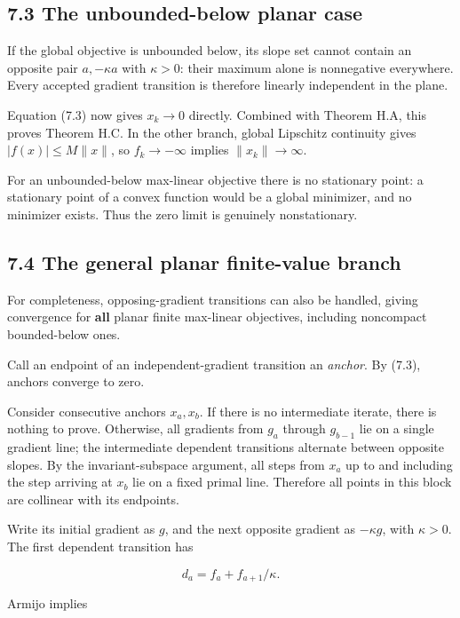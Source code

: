 \subsection{7.3 The unbounded-below planar
case}\label{H:the-unbounded-below-planar-case}

If the global objective is unbounded below, its slope set cannot contain
an opposite pair \(a,-\kappa a\) with \(\kappa>0\): their maximum alone
is nonnegative everywhere. Every accepted gradient transition is
therefore linearly independent in the plane.

Equation (7.3) now gives \(x_k\to0\) directly. Combined with Theorem H.A,
this proves Theorem H.C. In the other branch, global Lipschitz continuity
gives \(|f(x)|\le M\|x\|\), so \(f_k\to-\infty\) implies
\(\|x_k\|\to\infty\).

For an unbounded-below max-linear objective there is no stationary
point: a stationary point of a convex function would be a global
minimizer, and no minimizer exists. Thus the zero limit is genuinely
nonstationary.

\subsection{7.4 The general planar finite-value
branch}\label{H:the-general-planar-finite-value-branch}

For completeness, opposing-gradient transitions can also be handled,
giving convergence for \textbf{all} planar finite max-linear objectives,
including noncompact bounded-below ones.

Call an endpoint of an independent-gradient transition an \emph{anchor}.
By (7.3), anchors converge to zero.

Consider consecutive anchors \(x_a,x_b\). If there is no intermediate
iterate, there is nothing to prove. Otherwise, all gradients from
\(g_a\) through \(g_{b-1}\) lie on a single gradient line; the
intermediate dependent transitions alternate between opposite slopes. By
the invariant-subspace argument, all steps from \(x_a\) up to and
including the step arriving at \(x_b\) lie on a fixed primal line.
Therefore all points in this block are collinear with its endpoints.

Write its initial gradient as \(g\), and the next opposite gradient as
\(-\kappa g\), with \(\kappa>0\). The first dependent transition has

\[
d_a=f_a+f_{a+1}/\kappa.
\]

Armijo implies


